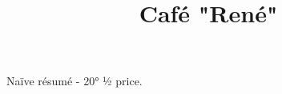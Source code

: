 \documentclass[11pt,a4paper]{article}
\title{Café "René"}
\begin{document}
\maketitle

Naïve résumé - 20° ½ price.
\end{document}
